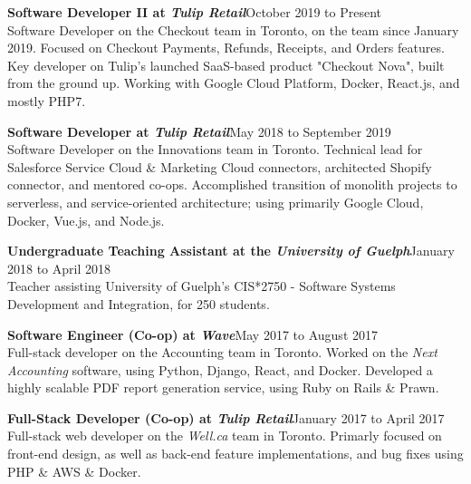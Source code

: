 \documentclass[9pt]{extarticle}
\begin{document}
{    \textbf{{\firamedium Software Developer II at \textit{Tulip Retail}}}{\color{darkgrey}\hfill{\small{October 2019 to Present\\[5pt]}}
        Software Developer on the Checkout team in Toronto, on the team since January 2019. Focused on Checkout Payments, Refunds, Receipts, and Orders features. Key developer on Tulip's launched SaaS-based product "Checkout Nova", built from the ground up. Working with Google Cloud Platform, Docker, React.js, and mostly PHP7.\\[-8pt]
    }

    \textbf{{\firamedium Software Developer at \textit{Tulip Retail}}}{\color{darkgrey}\hfill{\small{May 2018 to September 2019\\[5pt]}}
        Software Developer on the Innovations team in Toronto. Technical lead for Salesforce Service Cloud \& Marketing Cloud connectors, architected Shopify connector, and mentored co-ops. Accomplished transition of monolith projects to serverless, and service-oriented architecture; using primarily Google Cloud, Docker, Vue.js, and Node.js.\\[-8pt]
    }

    \textbf{{\firamedium Undergraduate Teaching Assistant at the \textit{University of Guelph}}}{\color{darkgrey}\hfill{\small{January 2018 to April 2018\\[5pt]}}
        Teacher assisting University of Guelph's CIS*2750 - Software Systems Development and Integration, for 250 students.\\[-8pt]
    }

    \textbf{{\firamedium Software Engineer (Co-op) at \textit{Wave}}}{\color{darkgrey}\hfill{\small{May 2017 to August 2017\\[5pt]}}
        Full-stack developer on the Accounting team in Toronto. Worked on the \textit{Next Accounting} software, using Python, Django, React, and Docker. Developed a highly scalable PDF report generation service, using Ruby on Rails \& Prawn.\\[-8pt]
    }

    \textbf{{\firamedium Full-Stack Developer (Co-op) at \textit{Tulip Retail}}}{\color{darkgrey}\hfill{\small{January 2017 to April 2017\\[5pt]}}
        Full-stack web developer on the \textit{Well.ca} team in Toronto. Primarly focused on front-end design, as well as back-end feature implementations, and bug fixes using PHP \& AWS \& Docker. \\[-8pt]
    }

}
\end{document}
